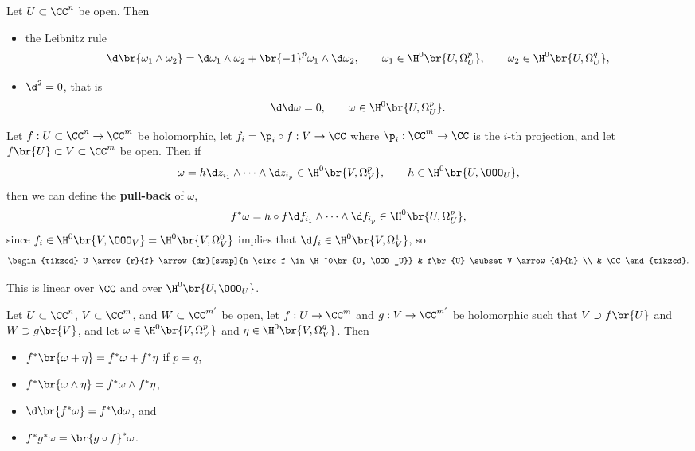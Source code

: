 \begin{proposition}
Let $ U \subset \CC^n $ be open. Then
\begin{itemize}
\item the Leibnitz rule
$$ \d\br{\omega_1 \wedge \omega_2} = \d\omega_1 \wedge \omega_2 + \br{-1}^p \omega_1 \wedge \d\omega_2, \qquad \omega_1 \in \H^0\br{U, \Omega_U^p}, \qquad \omega_2 \in \H^0\br{U, \Omega_U^q}, $$
\item $ \d^2 = 0 $, that is
$$ \d\d\omega = 0, \qquad \omega \in \H^0\br{U, \Omega_U^p}. $$
\end{itemize}
\end{proposition}

\pagebreak

\begin{definition}
Let $ f : U \subset \CC^n \to \CC^m $ be holomorphic, let $ f_i = \p_i \circ f : V \to \CC $ where $ \p_i : \CC^m \to \CC $ is the $ i $-th projection, and let $ f\br{U} \subset V \subset \CC^m $ be open. Then if
$$ \omega = h\d z_{i_1} \wedge \dots \wedge \d z_{i_p} \in \H^0\br{V, \Omega_V^p}, \qquad h \in \H^0\br{U, \OOO_U}, $$
then we can define the \textbf{pull-back} of $ \omega $,
$$ f^*\omega = h \circ f\d f_{i_1} \wedge \dots \wedge \d f_{i_p} \in \H^0\br{U, \Omega_U^p}, $$
since $ f_i \in \H^0\br{V, \OOO_V} = \H^0\br{V, \Omega_V^0} $ implies that $ \d f_i \in \H^0\br{V, \Omega_V^1} $, so
$$
\begin{tikzcd}
U \arrow{r}{f} \arrow{dr}[swap]{h \circ f \in \H^0\br{U, \OOO_U}} & f\br{U} \subset V \arrow{d}{h} \\
& \CC
\end{tikzcd}.
$$
\end{definition}

This is linear over $ \CC $ and over $ \H^0\br{U, \OOO_U} $.

\begin{proposition}
Let $ U \subset \CC^n $, $ V \subset \CC^m $, and $ W \subset \CC^{m'} $ be open, let $ f : U \to \CC^m $ and $ g : V \to \CC^{m'} $ be holomorphic such that $ V \supset f\br{U} $ and $ W \supset g\br{V} $, and let $ \omega \in \H^0\br{V, \Omega_V^p} $ and $ \eta \in \H^0\br{V, \Omega_V^q} $. Then
\begin{itemize}
\item $ f^*\br{\omega + \eta} = f^*\omega + f^*\eta $ if $ p = q $,
\item $ f^*\br{\omega \wedge \eta} = f^*\omega \wedge f^*\eta $,
\item $ \d\br{f^*\omega} = f^*\d\omega $, and
\item $ f^*g^*\omega = \br{g \circ f}^*\omega $.
\end{itemize}
\end{proposition}

